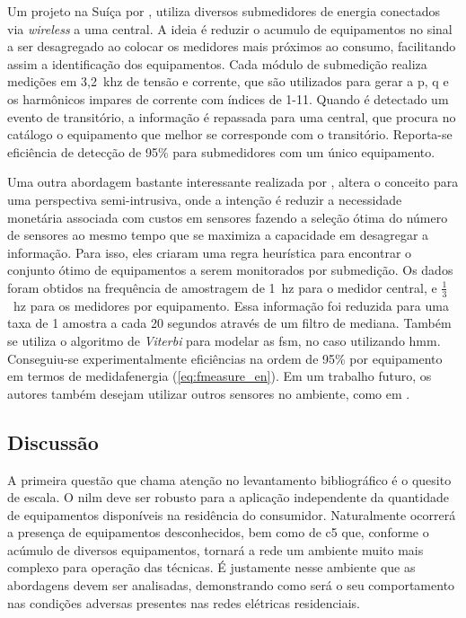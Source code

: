 Um projeto na Suíça por \cite{seminilm_ihome_tomek_2012}, utiliza
diversos submedidores de energia conectados via \emph{wireless} a uma
central. A ideia é reduzir o acumulo de equipamentos no sinal a ser
desagregado ao colocar os medidores mais próximos ao consumo,
facilitando assim a identificação dos equipamentos. Cada módulo de
submedição realiza medições em 3,2~k\acs{hz} de tensão e corrente, que
são utilizados para gerar a \acl{p}, \acl{q} e os harmônicos impares
de corrente com índices de 1-11. Quando é detectado um evento de
transitório, a informação é repassada para uma central, que procura no
catálogo o equipamento que melhor se corresponde com o transitório.
Reporta-se eficiência de detecção de 95\% para submedidores com um
único equipamento.

Uma outra abordagem bastante interessante realizada por
\citet*{seminilm_fhmm_empiricalnmeter_2013}, altera o conceito
para uma perspectiva semi-intrusiva, onde a intenção é
reduzir a necessidade monetária associada com custos em
sensores fazendo a seleção ótima do número de sensores ao mesmo tempo
que se maximiza a capacidade em desagregar a informação. Para isso,
eles criaram uma regra heurística para encontrar o conjunto ótimo de
equipamentos a serem monitorados por submedição. Os dados foram obtidos
na frequência de amostragem de 1~\acs{hz} para o medidor central,
e $\frac{1}{3}$~\acs{hz} para os medidores por equipamento. Essa
informação foi reduzida para uma taxa de 1 amostra a cada 20 segundos
através de um filtro de mediana. Também se utiliza o
algoritmo de \emph{Viterbi} para modelar as \gls{fsm}, no caso
utilizando \gls{hmm}. Conseguiu-se experimentalmente eficiências na
ordem de 95\% por equipamento em termos de \acs{medidafenergia}
(\ref{eq:fmeasure_en}). Em um trabalho futuro, os autores também
desejam utilizar outros sensores no ambiente, como em
\cite{seminilm_berges_multisensor_2010}.

\subsection{Discussão}
\label{ssec:nilm_discussao}

A primeira questão que chama atenção no levantamento bibliográfico é o
quesito de escala. O \gls{nilm} deve ser robusto para a aplicação
independente da quantidade de equipamentos disponíveis na residência do
consumidor. Naturalmente ocorrerá a presença de equipamentos
desconhecidos, bem como de \gls{c5} que, conforme o acúmulo de
diversos equipamentos, tornará a rede um ambiente muito mais complexo
para operação das técnicas. É justamente nesse ambiente que as
abordagens devem ser analisadas, demonstrando como será o seu
comportamento nas condições adversas presentes nas redes elétricas
residenciais.


